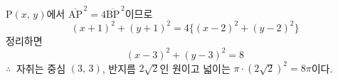 \documentclass[10pt]{article}
\begin{document}
\begin{dmsolution}
$\mathrm{P}(x,\, y)$에서 $\overline{\mathrm{AP}}^{\,2} = 4\overline{\mathrm{BP}}^{\,2}$이므로
\begin{equation*}
  (x + 1)^2 + (y + 1)^2 = 4\{(x - 2)^2 + (y - 2)^2\}
\end{equation*}
정리하면
\begin{equation*}
  (x - 3)^2 + (y - 3)^2 = 8
\end{equation*}
$\therefore\ $ 자취는 중심 $(3,\, 3)$, 반지름 $2\sqrt{2}$인 원이고 넓이는 $\pi \cdot (2\sqrt{2})^2 = 8\pi$이다.
\dmanswer{$8\pi$}
\end{dmsolution}

\dmchecktitle



\newpage

\dmconcepthead
{}
\end{document}
